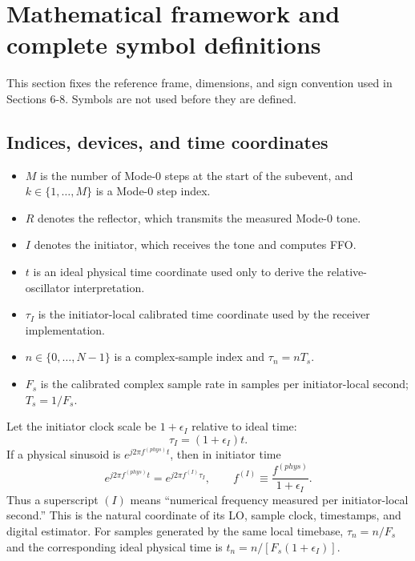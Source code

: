 \documentclass[10pt,a4paper]{article}
\begin{document}
\clearpage
\section{Mathematical framework and complete symbol definitions}
\label{sec:framework}
This section fixes the reference frame, dimensions, and sign convention used in Sections 6-8. Symbols are not used before they are defined.

\subsection{Indices, devices, and time coordinates}
\begin{itemize}
\item $M$ is the number of Mode-0 steps at the start of the subevent, and $k\in\{1,\ldots,M\}$ is a Mode-0 step index.
\item $R$ denotes the reflector, which transmits the measured Mode-0 tone.
\item $I$ denotes the initiator, which receives the tone and computes FFO.
\item $t$ is an ideal physical time coordinate used only to derive the relative-oscillator interpretation.
\item $\tau_I$ is the initiator-local calibrated time coordinate used by the receiver implementation.
\item $n\in\{0,\ldots,N-1\}$ is a complex-sample index and $\tau_n=nT_s$.
\item $F_s$ is the calibrated complex sample rate in samples per initiator-local second; $T_s=1/F_s$.
\end{itemize}

Let the initiator clock scale be $1+\epsilon_I$ relative to ideal time:
\begin{equation}
\tau_I=(1+\epsilon_I)t.
\label{eq:localtime}
\end{equation}
If a physical sinusoid is $e^{j2\pi f^{(phys)}t}$, then in initiator time
\begin{equation}
e^{j2\pi f^{(phys)}t}=e^{j2\pi f^{(I)}\tau_I},\qquad
f^{(I)}\equiv\frac{f^{(phys)}}{1+\epsilon_I}.
\label{eq:freqcoordinate}
\end{equation}
Thus a superscript $(I)$ means ``numerical frequency measured per initiator-local second.'' This is the natural coordinate of its LO, sample clock, timestamps, and digital estimator.
For samples generated by the same local timebase, $\tau_n=n/F_s$ and the corresponding ideal physical time is $t_n=n/[F_s(1+\epsilon_I)]$.
\end{document}
